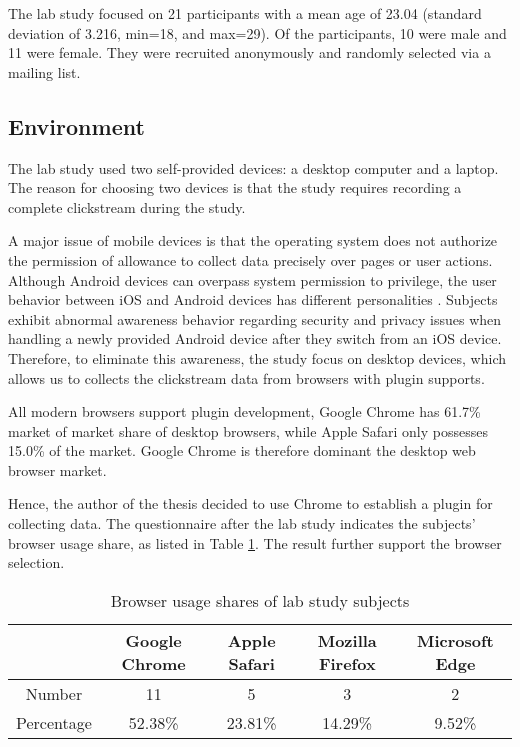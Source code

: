 The lab study focused on 21 participants with a mean age of 23.04 (standard deviation of 3.216, 
min=18, and max=29). Of the participants, 10 were male and 11 were female. They were recruited 
anonymously and randomly selected via a mailing list.

\subsection{Environment}

The lab study used two self-provided devices: a desktop computer and a laptop.
The reason for choosing two devices is that the study requires recording
a complete clickstream during the study.

A major issue of mobile devices is that the operating system does not
authorize the permission of allowance to collect data precisely over pages or user actions.
Although Android devices can overpass system permission to privilege, the user behavior 
between iOS and Android devices has different personalities \cite{sandoio2018android}. 
Subjects exhibit \cite{reinfelder2014androidios} abnormal awareness behavior 
regarding security and privacy issues when handling a newly provided Android device 
after they switch from an iOS device.
Therefore, to eliminate this awareness, the study focus on desktop devices,
which allows us to collects the clickstream data from browsers with plugin supports.

All modern browsers support plugin development, Google Chrome \cite{wiki2018share} has 61.7\% 
market of market share of desktop browsers, 
while Apple Safari only possesses 15.0\% of the market. 
Google Chrome is therefore dominant the desktop web browser market.

Hence, the author of the thesis decided to use Chrome to establish a plugin for collecting data.
The questionnaire after the lab study indicates the subjects' browser usage share, 
as listed in Table \ref{table:sharesubjects}. The result further support the browser selection.

\begin{table}[H]
    \small
    \centering
    \setlength{\belowcaptionskip}{10pt}
    \caption{Browser usage shares of lab study subjects}
    \begin{tabular}{ccccc}
          \toprule
        & \textbf{Google Chrome} & \textbf{Apple Safari} & \textbf{Mozilla Firefox} & \textbf{Microsoft Edge} \\
          \hline
          Number     & 11 & 5 & 3 & 2 \\
          Percentage & 52.38\% & 23.81\% & 14.29\% & 9.52\% \\
          \bottomrule
    \end{tabular}
    \label{table:sharesubjects}
\end{table}

